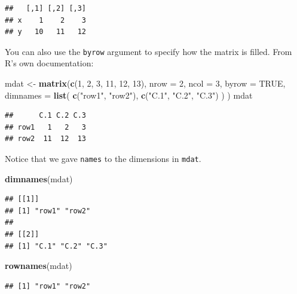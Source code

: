 \documentclass[
]{book}
\newenvironment{Shaded}{\begin{snugshade}}{\end{snugshade}}
\newcommand{\AttributeTok}[1]{\textcolor[rgb]{0.13,0.29,0.53}{#1}}
\newcommand{\ConstantTok}[1]{\textcolor[rgb]{0.56,0.35,0.01}{#1}}
\newcommand{\DecValTok}[1]{\textcolor[rgb]{0.00,0.00,0.81}{#1}}
\newcommand{\FunctionTok}[1]{\textcolor[rgb]{0.13,0.29,0.53}{\textbf{#1}}}
\newcommand{\NormalTok}[1]{#1}
\newcommand{\OtherTok}[1]{\textcolor[rgb]{0.56,0.35,0.01}{#1}}
\newcommand{\StringTok}[1]{\textcolor[rgb]{0.31,0.60,0.02}{#1}}
\begin{document}
\begin{verbatim}
##   [,1] [,2] [,3]
## x    1    2    3
## y   10   11   12
\end{verbatim}

You can also use the \texttt{byrow} argument to specify how the matrix is filled. From R's own documentation:

\begin{Shaded}
\begin{Highlighting}[]
\NormalTok{mdat }\OtherTok{\textless{}{-}} \FunctionTok{matrix}\NormalTok{(}\FunctionTok{c}\NormalTok{(}\DecValTok{1}\NormalTok{, }\DecValTok{2}\NormalTok{, }\DecValTok{3}\NormalTok{, }\DecValTok{11}\NormalTok{, }\DecValTok{12}\NormalTok{, }\DecValTok{13}\NormalTok{),}
  \AttributeTok{nrow =} \DecValTok{2}\NormalTok{,}
  \AttributeTok{ncol =} \DecValTok{3}\NormalTok{,}
  \AttributeTok{byrow =} \ConstantTok{TRUE}\NormalTok{,}
  \AttributeTok{dimnames =} \FunctionTok{list}\NormalTok{(}
    \FunctionTok{c}\NormalTok{(}\StringTok{"row1"}\NormalTok{, }\StringTok{"row2"}\NormalTok{),}
    \FunctionTok{c}\NormalTok{(}\StringTok{"C.1"}\NormalTok{, }\StringTok{"C.2"}\NormalTok{, }\StringTok{"C.3"}\NormalTok{)}
\NormalTok{  )}
\NormalTok{)}
\NormalTok{mdat}
\end{Highlighting}
\end{Shaded}

\begin{verbatim}
##      C.1 C.2 C.3
## row1   1   2   3
## row2  11  12  13
\end{verbatim}

Notice that we gave \texttt{names} to the dimensions in \texttt{mdat}.

\begin{Shaded}
\begin{Highlighting}[]
\FunctionTok{dimnames}\NormalTok{(mdat)}
\end{Highlighting}
\end{Shaded}

\begin{verbatim}
## [[1]]
## [1] "row1" "row2"
## 
## [[2]]
## [1] "C.1" "C.2" "C.3"
\end{verbatim}

\begin{Shaded}
\begin{Highlighting}[]
\FunctionTok{rownames}\NormalTok{(mdat)}
\end{Highlighting}
\end{Shaded}

\begin{verbatim}
## [1] "row1" "row2"
\end{verbatim}
\end{document}
